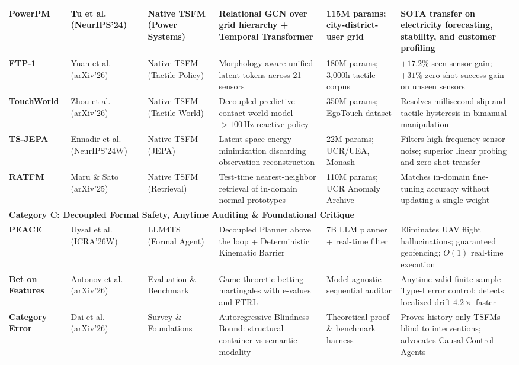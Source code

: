 \begin{table}[t]
{\begin{tabular}{llllll}
\midrule
\textbf{PowerPM} & Tu et al.~\cite{tu2024powerpm} (NeurIPS'24) & Native TSFM (Power Systems) & Relational GCN over grid hierarchy + Temporal Transformer & 115M params; city-district-user grid & SOTA transfer on electricity forecasting, stability, and customer profiling \\
\midrule
\textbf{FTP-1} & Yuan et al.~\cite{yuan2026ftp1} (arXiv'26) & Native TSFM (Tactile Policy) & Morphology-aware unified latent tokens across 21 sensors & 180M params; 3,000h tactile corpus & $+17.2\%$ seen sensor gain; $+31\%$ zero-shot success gain on unseen sensors \\
\midrule
\textbf{TouchWorld} & Zhou et al.~\cite{zhou2026touchworld} (arXiv'26) & Native TSFM (Tactile World) & Decoupled predictive contact world model + $>100\,\text{Hz}$ reactive policy & 350M params; EgoTouch dataset & Resolves millisecond slip and tactile hysteresis in bimanual manipulation \\
\midrule
\textbf{TS-JEPA} & Ennadir et al.~\cite{ennadir2025tsjepa} (NeurIPS'24W) & Native TSFM (JEPA) & Latent-space energy minimization discarding observation reconstruction & 22M params; UCR/UEA, Monash & Filters high-frequency sensor noise; superior linear probing and zero-shot transfer \\
\midrule
\textbf{RATFM} & Maru \& Sato~\cite{maru2025ratfm} (arXiv'25) & Native TSFM (Retrieval) & Test-time nearest-neighbor retrieval of in-domain normal prototypes & 110M params; UCR Anomaly Archive & Matches in-domain fine-tuning accuracy without updating a single weight \\
\midrule
\multicolumn{6}{l}{\textbf{Category C: Decoupled Formal Safety, Anytime Auditing \& Foundational Critique}} \\
\midrule
\textbf{PEACE} & Uysal et al.~\cite{uysal2026peace} (ICRA'26W) & LLM4TS (Formal Agent) & Decoupled Planner above the loop + Deterministic Kinematic Barrier & 7B LLM planner + real-time filter & Eliminates UAV flight hallucinations; guaranteed geofencing; $O(1)$ real-time execution \\
\midrule
\textbf{Bet on Features} & Antonov et al.~\cite{antonov2026betonfeatures} (arXiv'26) & Evaluation \& Benchmark & Game-theoretic betting martingales with e-values and FTRL & Model-agnostic sequential auditor & Anytime-valid finite-sample Type-I error control; detects localized drift $4.2\times$ faster \\
\midrule
\textbf{Category Error} & Dai et al.~\cite{dai2026categoryerror} (arXiv'26) & Survey \& Foundations & Autoregressive Blindness Bound: structural container vs semantic modality & Theoretical proof \& benchmark harness & Proves history-only TSFMs blind to interventions; advocates Causal Control Agents \\
\bottomrule
\end{tabular}
}
\end{table}

